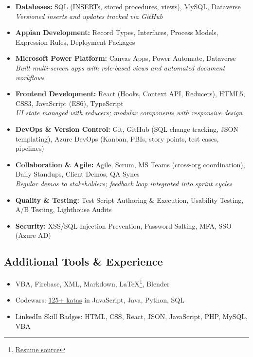 \documentclass{article}
\begin{document}
\begin{itemize}
  \item \textbf{Databases:} SQL (INSERTs, stored procedures, views), MySQL, Dataverse\\
  \textit{Versioned inserts and updates tracked via GitHub}
  
  \item \textbf{Appian Development:} Record Types, Interfaces, Process Models, Expression Rules, Deployment Packages
  
  \item \textbf{Microsoft Power Platform:} Canvas Apps, Power Automate, Dataverse\\
  \textit{Built multi-screen apps with role-based views and automated document workflows}
  
  \item \textbf{Frontend Development:} React (Hooks, Context API, Reducers), HTML5, CSS3, JavaScript (ES6), TypeScript\\
  \textit{UI state managed with reducers; modular components with responsive design}
  
  \item \textbf{DevOps \& Version Control:} Git, GitHub (SQL change tracking, JSON templating), Azure DevOps (Kanban, PBIs, story points, test cases, pipelines)
  
  \item \textbf{Collaboration \& Agile:} Agile, Scrum, MS Teams (cross-org coordination), Daily Standups, Client Demos, QA Syncs\\
  \textit{Regular demos to stakeholders; feedback loop integrated into sprint cycles}
  
  \item \textbf{Quality \& Testing:} Test Script Authoring \& Execution, Usability Testing, A/B Testing, Lighthouse Audits

  \item \textbf{Security:} XSS/SQL Injection Prevention, Password Salting, MFA, SSO (Azure AD)
\end{itemize}

\vspace{0.5em}
\subsection*{Additional Tools \& Experience}
\begin{itemize}
  \item VBA, Firebase, XML, Markdown, \LaTeX\footnote{\href{https://github.com/sirkoik/CurriculumVitae/blob/master/source/main/resume.tex}{Resume source}}, Blender
  \item Codewars: \href{https://www.codewars.com/users/sirkoik}{125+ katas} in JavaScript, Java, Python, SQL
  \item LinkedIn Skill Badges: HTML, CSS, React, JSON, JavaScript, PHP, MySQL, VBA
\end{itemize}
\end{document}
